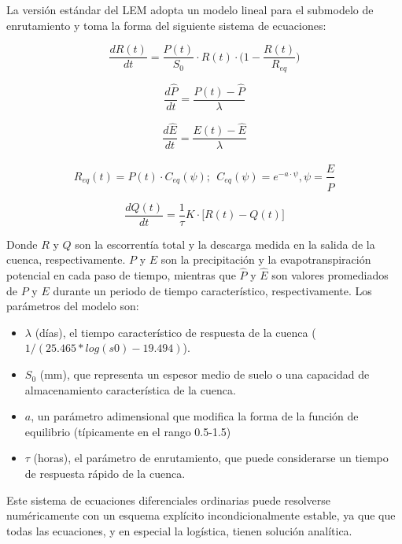 La versión estándar del LEM adopta un modelo lineal para el submodelo de enrutamiento y toma la forma del siguiente sistema de 
ecuaciones:


\begin{equation}
    \frac{d R(t)}{dt}=\frac{P(t)}{S_0}\cdot R(t)\cdot\big(1-\frac{R(t)}{R_{eq}}\big)
\end{equation}

\begin{equation}
    \frac{d \hat{P}}{dt}=\frac{P(t)-\hat{P}}{\lambda}
\end{equation}


\begin{equation}
    \frac{d \hat{E}}{dt}=\frac{E(t)-\hat{E}}{\lambda}
\end{equation}


\begin{equation}
    R_{eq}(t)=P(t)\cdot C_{eq}(\psi);\ \ C_{eq}(\psi)=e^{-a\cdot \psi}, \psi=\frac{\hat{E}}{\hat{P}}
\end{equation}


\begin{equation}
    \frac{d Q(t)}{dt}=\frac{1}{\tau}K\cdot \big[R(t)-Q(t)\big]
\end{equation}


Donde $R$ y $Q$ son la escorrentía total y la descarga medida en la salida de la cuenca, respectivamente. 
$P$ y $E$ son la precipitación y la evapotranspiración potencial en cada paso de tiempo, mientras que $\hat{P}$ y $\hat{E}$ 
son valores promediados de $P$ y $E$ durante un periodo de tiempo característico, respectivamente. 
Los parámetros del modelo son:

\begin{itemize}
    \item $\lambda$ (días), el tiempo característico de respuesta  de la cuenca ($1/(25.465*log(s0)-19.494)$).
    \item $S_0$ (mm), que representa un espesor medio de suelo o una capacidad de almacenamiento característica de la cuenca.
    \item $a$, un parámetro adimensional que modifica la forma de la función de equilibrio (típicamente en el rango 0.5-1.5)
    \item $\tau$ (horas), el parámetro de enrutamiento, que puede considerarse un tiempo 
    de respuesta rápido de la cuenca.
\end{itemize}

Este sistema de ecuaciones diferenciales ordinarias puede resolverse numéricamente con un esquema explícito 
incondicionalmente estable, ya que  que todas las ecuaciones, y en especial la logística, tienen solución analítica.

